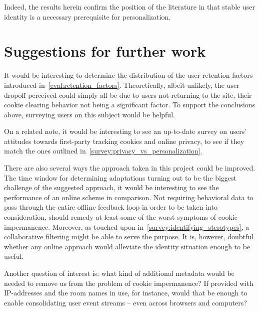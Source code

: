     Indeed, the results herein confirm the position of the literature in that stable user identity is a necessary prerequisite for personalization.

\section{Suggestions for further work} %
\label{conclusion:sec:further_work}

  It would be interesting to determine the distribution of the user retention factors introduced in~\ref{eval:retention_factors}. Theoretically, albeit unlikely, the user dropoff perceived could simply all be due to users not returning to the site, their cookie clearing behavior not being a significant factor. To support the conclusions above, surveying users on this subject would be helpful.

  On a related note, it would be interesting to see an up-to-date survey on users' attitudes towards first-party tracking cookies and online privacy, to see if they match the ones outlined in~\ref{survey:privacy_vs_personalization}.

  There are also several ways the approach taken in this project could be improved. The time window for determining adaptations turning out to be the biggest challenge of the suggested approach, it would be interesting to see the performance of an online scheme in comparison. Not requiring behavioral data to pass through the entire offline feedback loop in order to be taken into consideration, should remedy at least some of the worst symptoms of cookie impermanence. Moreover, as touched upon in~\ref{survey:identifying_sterotypes}, a collaborative filtering might be able to serve the purpose. It is, however, doubtful whether any online approach would alleviate the identity situation enough to be useful.

  Another question of interest is: what kind of additional metadata would be needed to remove us from the problem of cookie impermanence? If provided with IP-addresses and the room names in use, for instance, would that be enough to enable consolidating user event streams -- even across browsers and computers?
